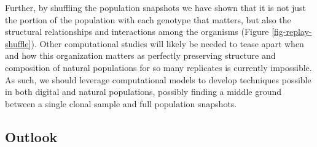 Further, by shuffling the population snapshots we have shown that it is not just the portion of the population with each genotype that matters, but also the structural relationships and interactions among the organisms (Figure \ref{fig-replay-shuffle}).
Other computational studies will likely be needed to tease apart when and how this organization matters %
as perfectly preserving structure and composition of natural populations for so many replicates is currently impossible. 
As such, we should leverage computational models to develop techniques possible in both digital and natural populations, possibly finding a middle ground between a single clonal sample and full population snapshots. 

\subsection{Outlook}



